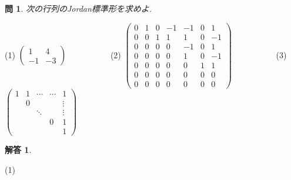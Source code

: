 \documentclass{jsarticle}
\newtheorem{question}{問}
\newtheorem*{answer*}{解答}
\begin{document}
\begin{question}
次の行列のJordan標準形を求めよ.
\end{question}

(1)
$\left(\begin{array}{cc}
1 & 4 \\
-1 & -3
\end{array}\right)$ \ \ \ \ \ \ \ \ \ \ 
(2)
\( \left(\begin{array}{ccccccc}0 & 1 & 0 & -1 & -1 & 0 & 1 \\ 0 & 0 & 1 & 1 & 1 & 0 & -1 \\ 0 & 0 & 0 & 0 & -1 & 0 & 1 \\ 0 & 0 & 0 & 0 & 1 & 0 & -1 \\ 0 & 0 & 0 & 0 & 0 & 1 & 1 \\ 0 & 0 & 0 & 0 & 0 & 0 & 0 \\ 0 & 0 & 0 & 0 & 0 & 0 & 0\end{array}\right) \) \ \ \ \ \ \ \ \ \ \ 
(3)
$
\left(\begin{array}{ccccc}
1 & 1 & \cdots & \cdots & 1 \\
& 0 & & & \vdots \\
& & \ddots & & \vdots \\
& & & 0 & 1 \\
& & & & 1
\end{array}\right)
$




\begin{answer*}
\end{answer*}
(1)
\end{document}
